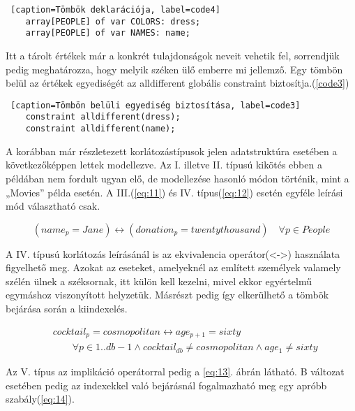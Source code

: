 \documentclass[12pt,a4paper]{report}
\begin{document}
    \begin{lstlisting} [caption=Tömbök deklarációja, label=code4]
    array[PEOPLE] of var COLORS: dress;
    array[PEOPLE] of var NAMES: name;\end{lstlisting}

    Itt a tárolt értékek már a konkrét tulajdonságok neveit vehetik fel, sorrendjük pedig meghatározza, hogy melyik széken ülő emberre mi jellemző.
    Egy tömbön belül az értékek egyediségét az alldifferent globális constraint biztosítja.(\ref{code3})
   
    \begin{lstlisting} [caption=Tömbön belüli egyediség biztosítása, label=code3]
    constraint alldifferent(dress);
    constraint alldifferent(name);\end{lstlisting}

    A korábban már részletezett korlátozástípusok jelen adatstruktúra esetében a következőképpen lettek modellezve.
    Az I. illetve II. típusú kikötés ebben a példában nem fordult ugyan elő, de modellezése hasonló módon történik, mint a „Movies” példa esetén.
    A III.(\ref{eq:11}) és IV. típus(\ref{eq:12}) esetén egyféle leírási mód választható csak.

    \begin{equation} \label{eq:11}
    (name_p=Jane) \leftrightarrow (donation_p=twentythousand) \quad \forall p \in People
    \end{equation}

    A IV. típusú korlátozás leírásánál is az ekvivalencia operátor(<->) használata figyelhető meg.
    Azokat az eseteket, amelyeknél az említett személyek valamely szélén ülnek a széksornak, itt külön kell kezelni, mivel ekkor egyértelmű egymáshoz viszonyított helyzetük.
    Másrészt pedig így elkerülhető a tömbök bejárása során a 
    kiindexelés.

	\begin{equation} \label{eq:12}
	\begin{aligned}
	&cocktail_p=cosmopolitan \leftrightarrow age_{p+1}=sixty \\
	&\quad\quad\forall p \in 1..db-1 \wedge cocktail_{db} \neq cosmopolitan \wedge age_1 \neq sixty
	\end{aligned} 
	\end{equation}

    Az V. típus az implikáció operátorral pedig a \ref{eq:13}. ábrán látható.
    B változat esetében pedig az indexekkel való bejárásnál fogalmazható meg egy apróbb szabály(\ref{eq:14}).
	
\end{document}
